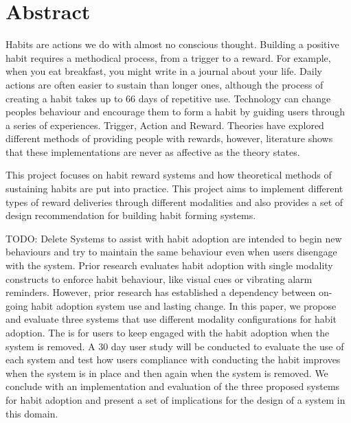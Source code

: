 
\section*{Abstract}

Habits are actions we do with almost no conscious thought. Building a positive habit requires a methodical process, from a trigger to a reward. For example, when you eat breakfast, you might write in a journal about your life. Daily actions are often easier to sustain than longer ones, although the process of creating a habit takes up to 66 days of repetitive use. Technology can change peoples behaviour and encourage them to form a habit by guiding users through a series of experiences. Trigger, Action and Reward. Theories have explored different methods of providing people with rewards, however, literature shows that these implementations are never as affective as the theory states.

This project focuses on habit reward systems and how theoretical methods of sustaining habits are put into practice. This project aims to implement different types of reward deliveries through different modalities and also provides a set of design recommendation for building habit forming systems.


TODO: Delete
Systems to assist with habit adoption are intended to begin new behaviours and try to maintain the same behaviour even when users disengage with the system. Prior research evaluates habit adoption with single modality constructs to enforce habit behaviour, like visual cues or vibrating alarm reminders. However, prior research has established a dependency between on-going habit adoption system use and lasting change. In this paper, we propose and evaluate three systems that use different modality configurations for habit adoption. The is for users to keep engaged with the habit adoption when the system is removed. A 30 day user study will be conducted to evaluate the use of each system and test how users compliance with conducting the habit improves when the system is in place and then again when the system is removed. We conclude with an implementation and evaluation of the three proposed systems for habit adoption and present a set of implications for the design of a system in this domain.